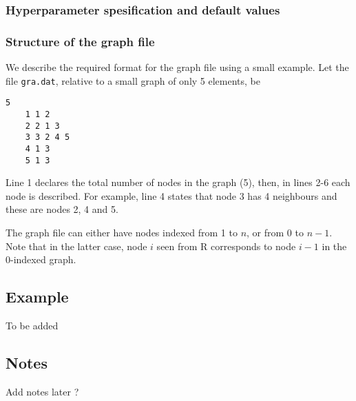 \documentclass[a4paper,11pt]{article}
\begin{document}
\subsubsection*{Hyperparameter spesification and default values}



\subsubsection*{Structure of the graph file}

We describe the required format for the graph file using a small
example. Let the file {\tt gra.dat}, relative to a small graph of only
5 elements, be
\begin{lstlisting}[basicstyle=\footnotesize]
    5
    1 1 2
    2 2 1 3
    3 3 2 4 5 
    4 1 3
    5 1 3
\end{lstlisting}
Line 1 declares the total number of nodes in the graph (5), then, in
lines 2-6 each node is described. For example, line 4 states that node
3 has 4 neighbours and these are nodes 2, 4 and 5.

The graph file can either have nodes indexed from 1 to $n$, or from 0
to $n-1$. Note that in the latter case, node $i$ seen from R
corresponds to node $i-1$ in the 0-indexed graph.



\subsection*{Example}

To be added

\subsection*{Notes}

Add notes later ? 
\end{document}
